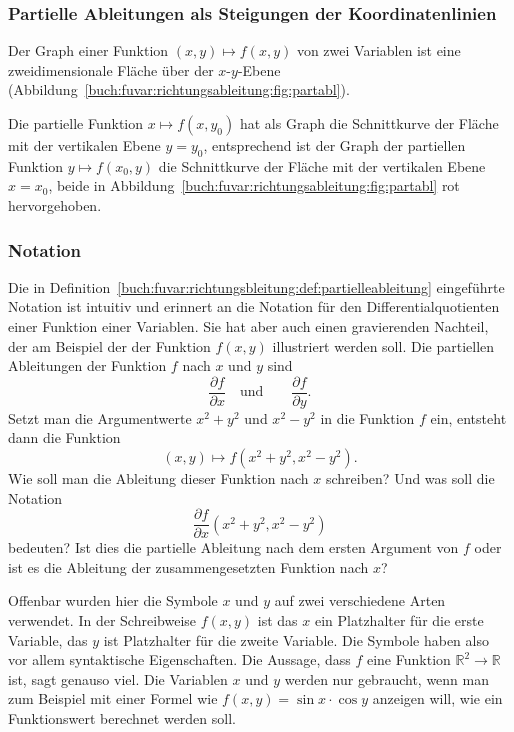 %
%
\subsubsection{Partielle Ableitungen als Steigungen der Koordinatenlinien}
Der Graph einer Funktion $(x,y)\mapsto f(x,y)$ von zwei Variablen ist 
eine zweidimensionale Fläche über der $x$-$y$-Ebene
(Abbildung~\ref{buch:fuvar:richtungsableitung:fig:partabl}).

Die partielle Funktion $x\mapsto f(x,y_0)$ hat als Graph die Schnittkurve
der Fläche mit der vertikalen Ebene $y=y_0$, entsprechend ist der Graph
der partiellen Funktion $y\mapsto f(x_0,y)$ die Schnittkurve der Fläche
mit der vertikalen Ebene $x=x_0$, beide in
Abbildung~\ref{buch:fuvar:richtungsableitung:fig:partabl} rot hervorgehoben.

%
%
\subsubsection{Notation}
Die in Definition~\ref{buch:fuvar:richtungsbleitung:def:partielleableitung}
eingeführte Notation ist intuitiv und erinnert an die Notation für den
Differentialquotienten einer Funktion einer Variablen.
Sie hat aber auch einen gravierenden Nachteil, der am Beispiel der
der Funktion $f(x,y)$ illustriert werden soll.
Die partiellen Ableitungen der Funktion $f$ nach $x$ und $y$ sind
\[
\frac{\partial f}{\partial x}
\quad\text{und}\qquad
\frac{\partial f}{\partial y}.
\]
Setzt man die Argumentwerte $x^2+y^2$ und $x^2-y^2$ in die Funktion
$f$ ein, entsteht dann die Funktion
\begin{equation}
(x,y) \mapsto f(x^2+y^2,x^2-y^2).
\label{buch:fuvar:richtungsableitung:eqn:feingesetzt}
\end{equation}
Wie soll man die Ableitung dieser Funktion nach $x$ schreiben?
Und was soll die Notation
\[
\frac{\partial f}{\partial x}(x^2+y^2,x^2-y^2)
\]
bedeuten?
Ist dies die partielle Ableitung nach dem ersten Argument von $f$
oder ist es die Ableitung der zusammengesetzten Funktion nach $x$?

Offenbar wurden hier die Symbole $x$ und $y$ auf zwei verschiedene
Arten verwendet.
In der Schreibweise $f(x,y)$ ist das $x$ ein Platzhalter für die
erste Variable, das $y$ ist Platzhalter für die zweite Variable.
Die Symbole haben also vor allem syntaktische Eigenschaften.
Die Aussage, dass $f$ eine Funktion $\mathbb{R}^2\to\mathbb{R}$
ist, sagt genauso viel.
Die Variablen $x$ und $y$ werden nur gebraucht, wenn man zum
Beispiel mit einer Formel wie $f(x,y)=\sin x\cdot\cos y$ 
anzeigen will, wie ein Funktionswert berechnet werden soll.

